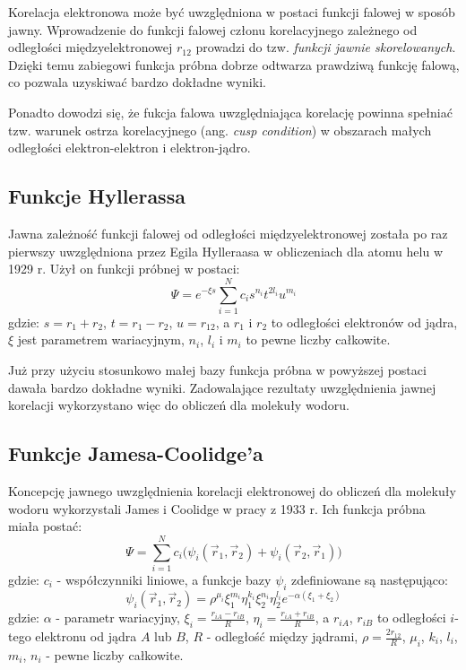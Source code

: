 \documentclass[a4paper,12pt]{article}
\numberwithin{equation}{section}
\numberwithin{table}{section}
\numberwithin{figure}{section}
\begin{document}
Korelacja elektronowa może być uwzględniona w postaci funkcji falowej w sposób jawny. Wprowadzenie do funkcji falowej członu korelacyjnego zależnego od odległości międzyelektronowej $r_{12}$ prowadzi do tzw. \emph{funkcji jawnie skorelowanych}. Dzięki temu zabiegowi funkcja próbna dobrze odtwarza prawdziwą funkcję falową, co pozwala uzyskiwać bardzo dokładne wyniki.

Ponadto dowodzi się, że fukcja falowa uwzględniająca korelację powinna spełniać tzw. warunek ostrza korelacyjnego (ang. \emph{cusp condition}) w obszarach małych odległości elektron-elektron i elektron-jądro.
\subsection{Funkcje Hyllerassa}
Jawna zależność funkcji falowej od odległości międzyelektronowej została po raz pierwszy uwzględniona przez Egila Hylleraasa w obliczeniach dla atomu helu w 1929 r. Użył on funkcji próbnej w postaci:
\begin{equation}\label{eq:hylleraas}
\Psi = e^{-\xi s} \sum\limits_{i=1}^N c_i s^{n_i}t^{2l_i}u^{m_i}
\end{equation}
gdzie: $s = r_1 + r_2$, $t = r_1 - r_2$,  $u = r_{12}$, a $r_1$ i $r_2$ to odległości elektronów od jądra, $\xi$ jest parametrem wariacyjnym, $n_i$, $l_i$ i $m_i$ to pewne liczby całkowite.

Już przy użyciu stosunkowo małej bazy funkcja próbna w powyższej postaci dawała bardzo dokładne wyniki. Zadowalające rezultaty uwzględnienia jawnej korelacji wykorzystano więc do obliczeń dla molekuły wodoru.

\subsection{Funkcje Jamesa-Coolidge'a}
Koncepcję jawnego uwzględnienia korelacji elektronowej do obliczeń dla molekuły wodoru wykorzystali James i Coolidge \cite{james33} w pracy z 1933 r. Ich funkcja próbna miała postać:
\begin{equation}
\Psi = \sum\limits_{i=1}^N c_i\big(\psi_i(\vec{r}_1,\vec{r}_2) + \psi_i(\vec{r}_2,\vec{r}_1)\big)
\end{equation}
gdzie: $c_i$ - współczynniki liniowe, a funkcje bazy $\psi_i$ zdefiniowane są następująco:
\begin{equation}
\psi_i (\vec{r}_1,\vec{r}_2)= \rho^{\mu_i} \xi_1^{m_i} \eta_1^{k_i} \xi_2^{n_i} \eta_2^{l_i} e^{-\alpha (\xi_1 +  \xi_2)}
\end{equation}
 gdzie: $\alpha$ - parametr wariacyjny, $\xi_i = \frac{r_{iA} - r_{iB}}{R}$, $\eta_i = \frac{r_{iA} + r_{iB}}{R}$, a $r_{iA}$, $r_{iB}$ to odległości $i$-tego elektronu od jądra $A$ lub $B$, $R$ - odległość między jądrami, $\rho = \frac{2r_{12}}{R}$, $\mu_i$, $k_i$, $l_i$, $m_i$, $n_i$ - pewne liczby całkowite.
\end{document}
